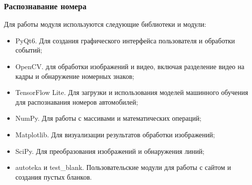 \subsubsection{Распознавание номера}

Для работы модуля используются следующие библиотеки и модули:
    \begin{itemize}
        \item PyQt6. Для создания графического интерфейса пользователя и обработки событий;
        \item OpenCV. для обработки изображений и видео, включая разделение видео на кадры и обнаружение номерных знаков;
        \item TensorFlow Lite. Для загрузки и использования моделей машинного обучения для распознавания номеров автомобилей;
        \item NumPy. Для работы с массивами и математических операций;
        \item Matplotlib. Для визуализации результатов обработки изображений;
        \item SciPy. Для преобразования изображений и обнаружения линий;
        \item autoteka и test\_blank. Пользовательские модули для работы с сайтом и создания пустых бланков.
    \end{itemize}

